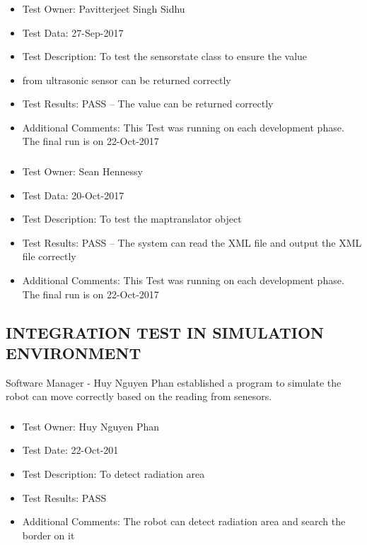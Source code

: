 \documentclass[10pt,a4paper,titlepage]{article}
\begin{document}
	\subsubsection{}
\begin{itemize}
\item Test Owner: Pavitterjeet Singh Sidhu
\item Test Data: 27-Sep-2017
\item Test Description: To test the sensorstate class to ensure the value \item from ultrasonic sensor can be returned correctly
\item Test Results: PASS – The value can be returned correctly
\item Additional Comments: This Test was running on each development phase. The final run is on 22-Oct-2017

\end{itemize}

	\subsubsection{}
\begin{itemize}
\item Test Owner: Sean Hennessy
\item Test Data: 20-Oct-2017
\item Test Description: To test the maptranslator object
\item Test Results: PASS – The system can read the XML file and output the XML file correctly  
\item Additional Comments: This Test was running on each development phase. The final run is on 22-Oct-2017

\end{itemize}

\subsection{INTEGRATION TEST IN SIMULATION ENVIRONMENT}
Software Manager - Huy Nguyen Phan established a program to simulate the robot can move correctly based on the reading from senesors.

	\subsubsection{}
\begin{itemize}
\item Test Owner:  Huy Nguyen Phan
\item Test Date: 22-Oct-201
\item Test Description: To detect radiation area 
\item Test Results: PASS
\item Additional Comments: The robot can detect radiation area and search the border on it
	
\end{itemize}
\end{document}
